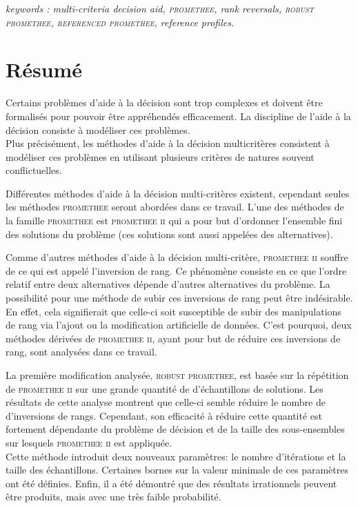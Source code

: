 \textit{keywords : multi-criteria decision aid, \textsc{promethee}, rank reversals, \textsc{robust promethee}, \textsc{referenced promethee}, reference profiles.}



\chapter*{\centering Résumé}

Certains problèmes d'aide à la décision sont trop complexes et doivent être formalisés pour pouvoir être appréhendés efficacement.
La discipline de l'aide à la décision consiste à modéliser ces problèmes. \\
Plus précisément, les méthodes d'aide à la décision multicritères consistent à modéliser ces problèmes en utilisant plusieurs critères de natures souvent conflictuelles.

Différentes méthodes d'aide à la décision multi-critères existent, cependant seules les méthodes \textsc{promethee} seront abordées dans ce travail.
L'une des méthodes de la famille \textsc{promethee} est \textsc{promethee ii} qui a pour but d'ordonner l'ensemble fini des solutions du problème (ces solutions sont aussi appelées des alternatives).

Comme d'autres méthodes d'aide à la décision multi-critère, \textsc{promethee ii} souffre de ce qui est appelé l'inversion de rang.
Ce phénomène consiste en ce que l'ordre relatif entre deux alternatives dépende d'autres alternatives du problème.
La possibilité pour une méthode de subir ces inversions de rang peut être indésirable. En effet, cela signifierait que celle-ci soit susceptible de subir des manipulations de rang via l'ajout ou la modification artificielle de données.
C'est pourquoi, deux méthodes dérivées de \textsc{promethee ii}, ayant pour but de réduire ces inversions de rang, sont analysées dans ce travail.

La première modification analysée, \textsc{robust promethee}, est basée sur la répétition de \textsc{promethee ii} sur une grande quantité de d'échantillons de solutions.
Les résultats de cette analyse montrent que celle-ci semble réduire le nombre de d'inversions de rangs.
Cependant, son efficacité à réduire cette quantité est fortement dépendante du problème de décision et de la taille des sous-ensembles sur lesquels \textsc{promethee ii} est appliquée.\\
Cette méthode introduit deux nouveaux paramètres: le nombre d'itérations et la taille des échantillons.
Certaines bornes sur la valeur minimale de ces paramètres ont été définies.
Enfin, il a été démontré que des résultats irrationnels peuvent être produits, mais avec une très faible probabilité.

